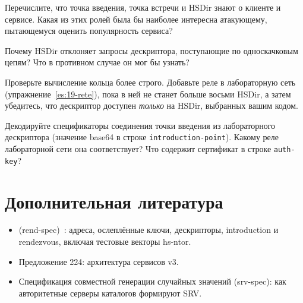 \begin{esercizio}[2]\label{es:14-ruoli}
Перечислите, что точка введения, точка встречи и HSDir знают о клиенте и сервисе. Какая из этих ролей была бы наиболее интересна атакующему, пытающемуся оценить популярность сервиса?
\end{esercizio}

\begin{esercizio}[2]\label{es:14-anonimo}
Почему HSDir отклоняет запросы дескриптора, поступающие по односкачковым цепям? Что в противном случае он мог бы узнать?
\end{esercizio}

\begin{esercizio}[3]\label{es:14-anello}
Проверьте вычисление кольца более строго. Добавьте реле в лабораторную сеть (упражнение~\ref{es:19-rete}), пока в ней не станет больше восьми HSDir, а затем убедитесь, что дескриптор доступен \emph{только} на HSDir, выбранных вашим кодом.
\end{esercizio}

\begin{esercizio}[3]\label{es:14-ipt}
Декодируйте спецификаторы соединения точки введения из лабораторного дескриптора (значение base64 в строке \texttt{introduction-point}). Какому реле лабораторной сети она соответствует? Что содержит сертификат в строке \texttt{auth-key}?
\end{esercizio}

\section*{Дополнительная литература}
\begin{itemize}
  \item {} (rend-spec)~\cite{torspec}: адреса, ослеплённые ключи, дескрипторы, introduction и rendezvous, включая тестовые векторы hs-ntor.
  \item Предложение 224: архитектура сервисов v3.
  \item Спецификация совместной генерации случайных значений (srv-spec): как авторитетные серверы каталогов формируют SRV.
\end{itemize}
